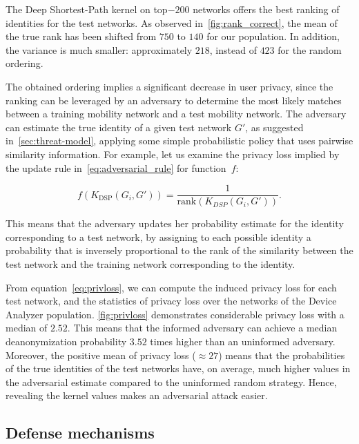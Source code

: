 The Deep Shortest-Path kernel on top$-200$ networks offers the best ranking of identities for the test networks.
As observed in~\cref{fig:rank_correct}, the mean of the true rank has been shifted from $ 750 $ to $ 140 $ for our population.
In addition, the variance is much smaller: approximately $ 218 $, instead of $ 423 $ for the random ordering.

The obtained ordering implies a significant decrease in user privacy, since the ranking can be leveraged by an adversary to determine the most likely matches between a training mobility network and a test mobility network.
The adversary can estimate the true identity of a given test network $ G' $, as suggested in~\cref{sec:threat-model}, applying some simple probabilistic policy that uses pairwise similarity information. For example, let us examine the privacy loss implied by the update rule in~\eqref{eq:adversarial_rule} for  \mbox{function $ f$}:

\[
f\left(K_{\text{DSP}}(G_i, G')\right) =\frac{1}{\text{rank}\left(K_{DSP}(G_i, G')\right)}.
\label{eq:inverse_rank}
\]

This means that the adversary updates her probability estimate for the identity corresponding to a test network, by assigning to each possible identity a probability that is inversely proportional to the rank of the similarity between the test network and the training network corresponding to the identity.

From equation~\eqref{eq:privloss}, we can compute the induced privacy loss for each test network, and the statistics of privacy loss over the networks of the Device Analyzer population.
\cref{fig:privloss} demonstrates considerable privacy loss with a median of $ 2.52 $.
This means that the informed adversary can achieve a median deanonymization probability $3.52$ times higher than an uninformed adversary.
Moreover, the positive mean of privacy loss ($ {\approx  27}$) means that the probabilities of  the true identities of the test networks have, on average, much higher values in the adversarial estimate compared to the uninformed random strategy.
Hence, revealing the kernel values makes an adversarial attack easier.

\subsection{Defense mechanisms }

